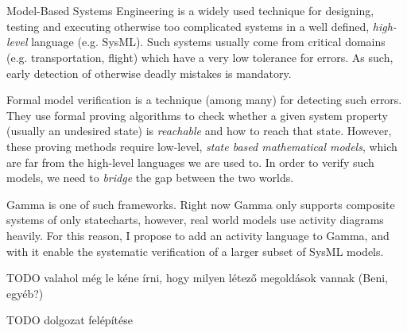 \chapter{\bevezetes}

Model-Based Systems Engineering is a widely used technique for designing, testing and executing otherwise too complicated systems in a well defined, \emph{high-level} language (e.g. SysML). Such systems usually come from critical domains (e.g. transportation, flight) which have a very low tolerance for errors. As such, early detection of otherwise deadly mistakes is mandatory.

Formal model verification is a technique (among many) for detecting such errors. They use formal proving algorithms to check whether a given system property (usually an undesired state) is \emph{reachable} and how to reach that state. However, these proving methods require low-level, \emph{state based mathematical models}, which are far from the high-level languages we are used to. In order to verify such models, we need to \emph{bridge} the gap between the two worlds.

Gamma is one of such frameworks. Right now Gamma only supports composite systems of only statecharts, however, real world models use activity diagrams heavily. For this reason, I propose to add an activity language to Gamma, and with it enable the systematic verification of a larger subset of SysML models.

TODO valahol még le kéne írni, hogy milyen létező megoldások vannak (Beni, egyéb?)

TODO dolgozat felépítése
